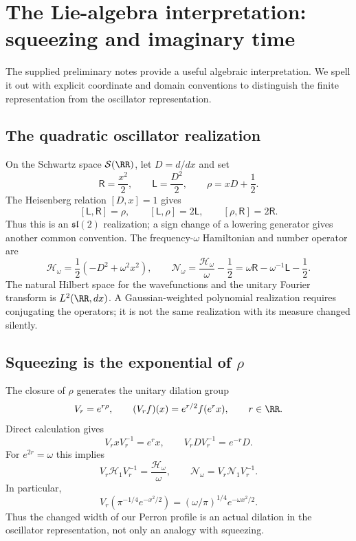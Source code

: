 \section{The Lie-algebra interpretation: squeezing and imaginary time}
\label{sec:Lie-algebra}
The supplied preliminary notes \cite{Notes} provide a useful algebraic
interpretation. We spell it out with explicit coordinate and domain
conventions to distinguish the finite representation from the oscillator
representation.

\subsection{The quadratic oscillator realization}
On the Schwartz space $\mathcal S(\RR)$, let $D=d/dx$ and set
\begin{equation}\label{eq:oscillator-sl2}
\mathsf R=\frac{x^2}{2},\qquad
\mathsf L=\frac{D^2}{2},\qquad
\rho=xD+\frac12.
\end{equation}
The Heisenberg relation $[D,x]=1$ gives
\begin{equation}\label{eq:oscillator-sl2-brackets}
[\mathsf L,\mathsf R]=\rho,\qquad
[\mathsf L,\rho]=2\mathsf L,\qquad
[\rho,\mathsf R]=2\mathsf R.
\end{equation}
Thus this is an $\mathfrak{sl}(2)$ realization; a sign change of a
lowering generator gives another common convention.
The frequency-$\omega$ Hamiltonian and number operator are
\begin{equation}\label{eq:omega-oscillator}
\mathscr H_\omega=\frac12(-D^2+\omega^2x^2),\qquad
\mathcal N_\omega=\frac{\mathscr H_\omega}{\omega}-\frac12
=\omega\mathsf R-\omega^{-1}\mathsf L-\frac12.
\end{equation}
The natural Hilbert space for the wavefunctions and the unitary Fourier
transform is $L^2(\RR,dx)$. A Gaussian-weighted polynomial realization
requires conjugating the operators; it is not the same realization
with its measure changed silently.

\subsection{Squeezing is the exponential of $\rho$}
The closure of $\rho$ generates the unitary dilation group
\begin{equation}\label{eq:dilation}
V_r=e^{r\rho},\qquad (V_rf)(x)=e^{r/2}f(e^rx),\qquad r\in\RR.
\end{equation}
Direct calculation gives
\[
V_rxV_r^{-1}=e^rx,\qquad V_rDV_r^{-1}=e^{-r}D.
\]
For $e^{2r}=\omega$ this implies
\begin{equation}\label{eq:squeezed-conjugacy}
V_r\mathscr H_1V_r^{-1}=\frac{\mathscr H_\omega}{\omega},\qquad
\mathcal N_\omega=V_r\mathcal N_1V_r^{-1}.
\end{equation}
In particular,
\[
V_r(\pi^{-1/4}e^{-x^2/2})
=(\omega/\pi)^{1/4}e^{-\omega x^2/2}.
\]
Thus the changed width of our Perron profile is an actual dilation
in the oscillator representation, not only an analogy with squeezing.

